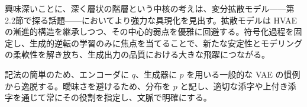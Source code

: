 興味深いことに、深く層状の階層という中核の考えは、変分拡散モデル——第2.2節で探る話題——においてより強力な具現化を見出す。拡散モデルは HVAE の漸進的構造を継承しつつ、その中心的弱点を優雅に回避する。符号化過程を固定し、生成的逆転の学習のみに焦点を当てることで、新たな安定性とモデリングの柔軟性を解き放ち、生成出力の品質における大きな飛躍につながる。

記法の簡単のため、エンコーダに $q$、生成器に $p$ を用いる一般的な VAE の慣例から逸脱する。曖昧さを避けるため、分布を $p$ と記し、適切な添字や上付き添字を通じて常にその役割を指定し、文脈で明確にする。

